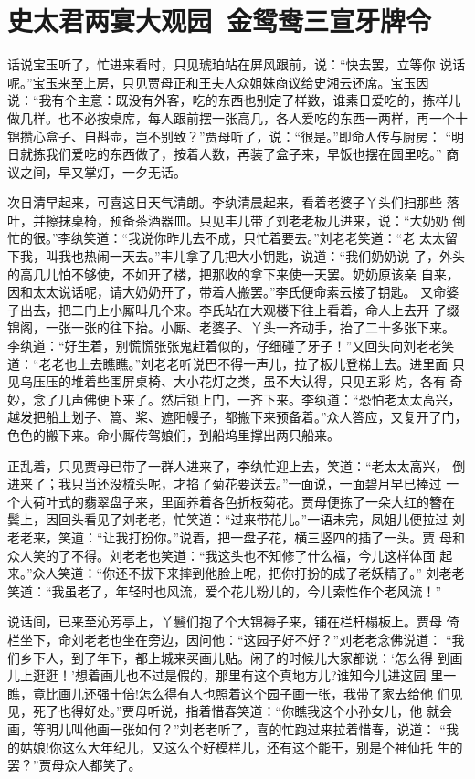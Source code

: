 \chapter{史太君两宴大观园~金鸳鸯三宣牙牌令}

话说宝玉听了，忙进来看时，只见琥珀站在屏风跟前，说：“快去罢，立等你
说话呢。”宝玉来至上房，只见贾母正和王夫人众姐妹商议给史湘云还席。宝玉因
说：“我有个主意：既没有外客，吃的东西也别定了样数，谁素日爱吃的，拣样儿
做几样。也不必按桌席，每人跟前摆一张高几，各人爱吃的东西一两样，再一个十
锦攒心盒子、自斟壶，岂不别致？”贾母听了，说：“很是。”即命人传与厨房：
“明日就拣我们爱吃的东西做了，按着人数，再装了盒子来，早饭也摆在园里吃。”
商议之间，早又掌灯，一夕无话。

次日清早起来，可喜这日天气清朗。李纨清晨起来，看着老婆子丫头们扫那些
落叶，并擦抹桌椅，预备茶酒器皿。只见丰儿带了刘老老板儿进来，说：“大奶奶
倒忙的很。”李纨笑道：“我说你昨儿去不成，只忙着要去。”刘老老笑道：“老
太太留下我，叫我也热闹一天去。”丰儿拿了几把大小钥匙，说道：“我们奶奶说
了，外头的高几儿怕不够使，不如开了楼，把那收的拿下来使一天罢。奶奶原该亲
自来，因和太太说话呢，请大奶奶开了，带着人搬罢。”李氏便命素云接了钥匙。
又命婆子出去，把二门上小厮叫几个来。李氏站在大观楼下往上看着，命人上去开
了缀锦阁，一张一张的往下抬。小厮、老婆子、丫头一齐动手，抬了二十多张下来。
李纨道：“好生着，别慌慌张张鬼赶着似的，仔细碰了牙子！”又回头向刘老老笑
道：“老老也上去瞧瞧。”刘老老听说巴不得一声儿，拉了板儿登梯上去。进里面
只见乌压压的堆着些围屏桌椅、大小花灯之类，虽不大认得，只见五彩灼，各有
奇妙，念了几声佛便下来了。然后锁上门，一齐下来。李纨道：“恐怕老太太高兴，
越发把船上划子、篙、桨、遮阳幔子，都搬下来预备着。”众人答应，又复开了门，
色色的搬下来。命小厮传驾娘们，到船坞里撑出两只船来。

正乱着，只见贾母已带了一群人进来了，李纨忙迎上去，笑道：“老太太高兴，
倒进来了；我只当还没梳头呢，才掐了菊花要送去。”一面说，一面碧月早已捧过
一个大荷叶式的翡翠盘子来，里面养着各色折枝菊花。贾母便拣了一朵大红的簪在
鬓上，因回头看见了刘老老，忙笑道：“过来带花儿。”一语未完，凤姐儿便拉过
刘老老来，笑道：“让我打扮你。”说着，把一盘子花，横三竖四的插了一头。贾
母和众人笑的了不得。刘老老也笑道：“我这头也不知修了什么福，今儿这样体面
起来。”众人笑道：“你还不拔下来摔到他脸上呢，把你打扮的成了老妖精了。”
刘老老笑道：“我虽老了，年轻时也风流，爱个花儿粉儿的，今儿索性作个老风流！”

说话间，已来至沁芳亭上，丫鬟们抱了个大锦褥子来，铺在栏杆榻板上。贾母
倚栏坐下，命刘老老也坐在旁边，因问他：“这园子好不好？”刘老老念佛说道：
“我们乡下人，到了年下，都上城来买画儿贴。闲了的时候儿大家都说：‘怎么得
到画儿上逛逛！’想着画儿也不过是假的，那里有这个真地方儿?谁知今儿进这园
里一瞧，竟比画儿还强十倍!怎么得有人也照着这个园子画一张，我带了家去给他
们见见，死了也得好处。”贾母听说，指着惜春笑道：“你瞧我这个小孙女儿，他
就会画，等明儿叫他画一张如何？”刘老老听了，喜的忙跑过来拉着惜春，说道：
“我的姑娘!你这么大年纪儿，又这么个好模样儿，还有这个能干，别是个神仙托
生的罢？”贾母众人都笑了。

